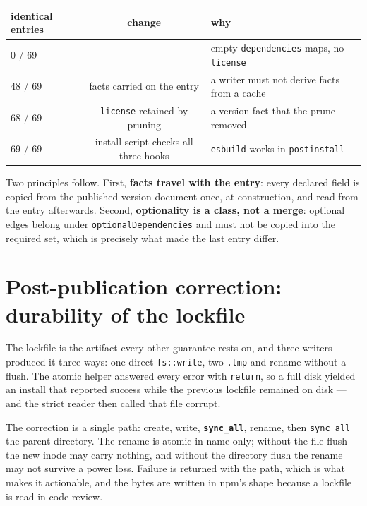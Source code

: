 \documentclass[
  11pt,
  letterpaper,
]{article}
\begin{document}
\begin{center}
\begin{tabular}{lcl}
identical entries & change & why \\
\hline
0 / 69 & -- & empty \texttt{dependencies} maps, no \texttt{license} \\
48 / 69 & facts carried on the entry & a writer must not derive facts from a cache \\
68 / 69 & \texttt{license} retained by pruning & a version fact that the prune removed \\
69 / 69 & install-script checks all three hooks & \texttt{esbuild} works in \texttt{postinstall} \\
\end{tabular}
\end{center}

Two principles follow. First, \textbf{facts travel with the entry}: every declared field is copied
from the published version document once, at construction, and read from the entry afterwards.
Second, \textbf{optionality is a class, not a merge}: optional edges belong under
\texttt{optionalDependencies} and must not be copied into the required set, which is precisely what
made the last entry differ.


\section{Post-publication correction: durability of the lockfile}

The lockfile is the artifact every other guarantee rests on, and three writers produced it three
ways: one direct \texttt{fs::write}, two \texttt{.tmp}-and-rename without a flush. The atomic helper
answered every error with \texttt{return}, so a full disk yielded an install that reported success
while the previous lockfile remained on disk --- and the strict reader then called that file corrupt.

The correction is a single path: create, write, \textbf{\texttt{sync\_all}}, rename, then
\texttt{sync\_all} the parent directory. The rename is atomic in name only; without the file flush
the new inode may carry nothing, and without the directory flush the rename may not survive a power
loss. Failure is returned with the path, which is what makes it actionable, and the bytes are
written in npm's shape because a lockfile is read in code review.
\end{document}
